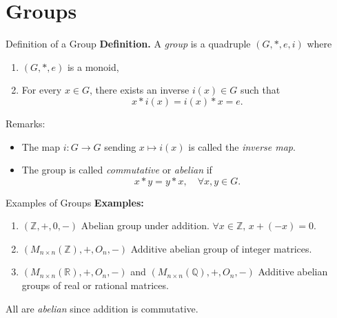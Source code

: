 \documentclass[11pt,aspectratio=43,ignorenonframetext,t]{beamer}
\begin{document}
\section{Groups}

\begin{frame}{Definition of a Group}
\textbf{Definition.}  
A \emph{group} is a quadruple $(G, *, e, i)$ where
\begin{enumerate}
  \item $(G,*,e)$ is a monoid,
  \item For every $x\in G$, there exists an inverse $i(x)\in G$ such that
  \[
  x * i(x) = i(x) * x = e.
  \]
\end{enumerate}

\begin{block}{Remarks:}
\begin{itemize}
  \item The map $i:G\to G$ sending $x\mapsto i(x)$ is called the \emph{inverse map}.
  \item The group is called \emph{commutative} or \emph{abelian} if
  \[
  x*y = y*x, \quad \forall x,y\in G.
  \]
\end{itemize}
\end{block}

\end{frame}

\begin{frame}{Examples of Groups}
\textbf{Examples:}
\begin{enumerate}
  \item $(\mathbb{Z}, +, 0, -)$  
        Abelian group under addition.  
        \(\forall x\in\mathbb{Z},\, x+(-x)=0.\)
  \item $(M_{n\times n}(\mathbb{Z}), +, O_n, -)$  
        Additive abelian group of integer matrices.
  \item $(M_{n\times n}(\mathbb{R}), +, O_n, -)$ and  
        $(M_{n\times n}(\mathbb{Q}), +, O_n, -)$  
        Additive abelian groups of real or rational matrices.
\end{enumerate}

\begin{center}
\end{center}
All are \emph{abelian} since addition is commutative.
\end{frame}
\end{document}
